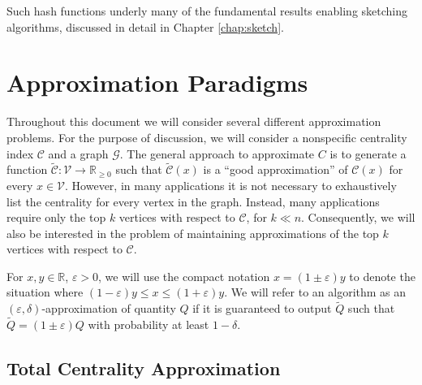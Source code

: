 \documentclass{report}
\begin{document}
Such hash functions underly many of the fundamental results enabling sketching algorithms, discussed in detail in Chapter \ref{chap:sketch}.


















\section{Approximation Paradigms} \label{sec:approx}

Throughout this document we will consider several different approximation problems. 
For the purpose of discussion, we will consider a nonspecific centrality index $\mathcal{C}$ and a graph $\mathcal{G}$.
The general approach to approximate $C$ is to generate a function $\widetilde{\mathcal{C}}: \mathcal{V} \rightarrow \mathbb{R}_{\geq 0}$ such that $\widetilde{\mathcal{C}}(x)$ is a ``good approximation'' of $\mathcal{C}(x)$ for every $x \in \mathcal{V}$. 
However, in many applications it is not necessary to exhaustively list the centrality for every vertex in the graph. 
Instead, many applications require only the top $k$ vertices with respect to $\mathcal{C}$, for $k \ll n$. 
Consequently, we will also be interested in the problem of maintaining approximations of the top $k$ vertices with respect to $\mathcal{C}$. 

For $x,y \in \mathbb{R}$, $\varepsilon > 0$, we will use the compact notation $x = (1 \pm \varepsilon)y$ to denote the situation where $(1-\varepsilon)y \leq x \leq (1+\varepsilon)y$. 
We will refer to an algorithm as an $(\varepsilon, \delta)$-approximation of quantity $Q$ if it is guaranteed to output $\widetilde{Q}$ such that $\widetilde{Q} = (1\pm \varepsilon)Q$ with probability at least $1-\delta$. 


\subsection{Total Centrality Approximation} \label{sec:approx:all}
\end{document}
